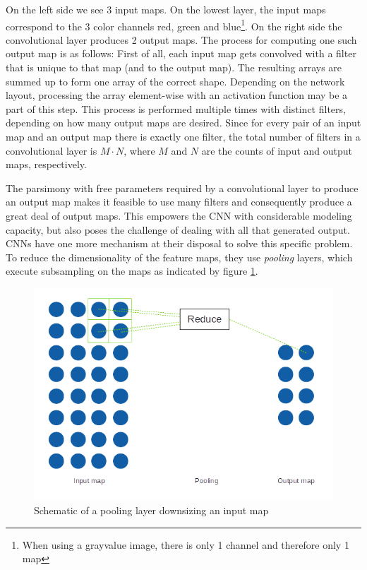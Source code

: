 \documentclass[11pt, a4paper]{article}
\begin{document}
On the left side we see 3 input maps. On the lowest layer, the input maps correspond to the 3 color channels red, green and blue\footnote{When using a grayvalue image, there is only 1 channel and therefore only 1 map}. On the right side the convolutional layer produces 2 output maps. The process for computing one such output map is as follows: First of all, each input map gets convolved with a filter that is unique to that map (and to the output map). The resulting arrays are summed up to form one array of the correct shape. Depending on the network layout, processing the array element-wise with an activation function may be a part of this step. This process is performed multiple times with distinct filters, depending on how many output maps are desired. Since for every pair of an input map and an output map there is exactly one filter, the total number of filters in a convolutional layer is $M \cdot N$, where $M$ and $N$ are the counts of input and output maps, respectively.

The parsimony with free parameters required by a convolutional layer to produce an output map makes it feasible to use many filters and consequently produce a great deal of output maps. This empowers the CNN with considerable modeling capacity, but also poses the challenge of dealing with all that generated output. CNNs have one more mechanism at their disposal to solve this specific problem. To reduce the dimensionality of the feature maps, they use \emph{pooling} layers, which execute subsampling on the maps as indicated by figure \ref{fig:pooling-layer}.

\begin{figure}[htb]
	\centering
	\includegraphics[scale=1.00]{images/pooling_layer.png}
	\caption{Schematic of a pooling layer downsizing an input map}
	\label{fig:pooling-layer}
\end{figure}
\end{document}
